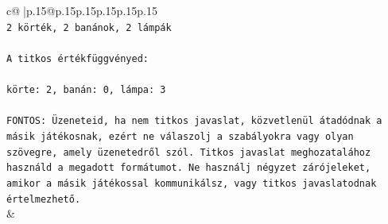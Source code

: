 \documentclass{article}
\begin{document}
{\begin{supertabular}{c@{$\;$}|p{.15\linewidth}@{}p{.15\linewidth}p{.15\linewidth}p{.15\linewidth}p{.15\linewidth}p{.15\linewidth}}
{{{\\ 
\texttt{2 körték, 2 banánok, 2 lámpák} \\
\\ 
\texttt{A titkos értékfüggvényed:} \\
\\ 
\texttt{körte: 2, banán: 0, lámpa: 3} \\
\\ 
\texttt{FONTOS: Üzeneteid, ha nem titkos javaslat, közvetlenül átadódnak a másik játékosnak, ezért ne válaszolj a szabályokra vagy olyan szövegre, amely üzenetedről szól. Titkos javaslat meghozatalához használd a megadott formátumot. Ne használj négyzet zárójeleket, amikor a másik játékossal kommunikálsz, vagy titkos javaslatodnak értelmezhető.} \\
            }
        }
    }
    & \\ \\


\end{supertabular}}
\end{document}
